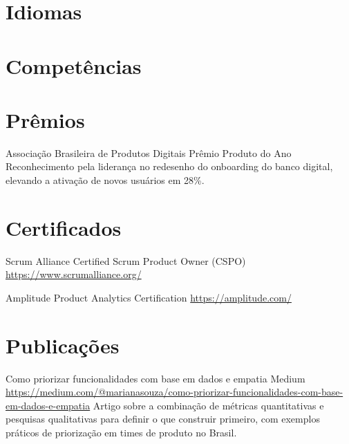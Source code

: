 \documentclass[a4paper, serif, 10pt]{moderncv}
\begin{document}
\section{Idiomas}

\section{Competências}

\section{Prêmios}

        {Associação Brasileira de Produtos Digitais}
        {Prêmio Produto do Ano}
        {}
        {}
        {Reconhecimento pela liderança no redesenho do onboarding do banco digital, elevando a ativação de novos usuários em 28\%.}
\section{Certificados}

        {Scrum Alliance}
        {Certified Scrum Product Owner (CSPO)}
        {\url{https://www.scrumalliance.org/}}
        {}
        {}

        {Amplitude}
        {Product Analytics Certification}
        {\url{https://amplitude.com/}}
        {}
        {}
\section{Publicações}

        {Como priorizar funcionalidades com base em dados e empatia}
        {Medium}
        {\url{https://medium.com/@marianasouza/como-priorizar-funcionalidades-com-base-em-dados-e-empatia}}
        {}
        {Artigo sobre a combinação de métricas quantitativas e pesquisas qualitativas para definir o que construir primeiro,
com exemplos práticos de priorização em times de produto no Brasil.}
\end{document}
